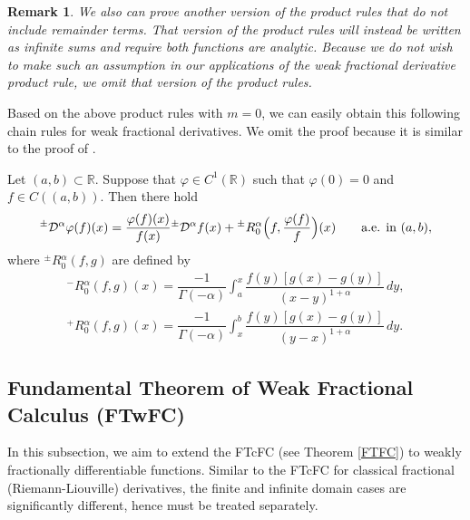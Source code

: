 \documentclass[leqno,final]{siamltex}
\numberwithin{equation}{section}
\newtheorem{remark}{Remark}[section]
\renewcommand{\(}{\bigl(}
\renewcommand{\)}{\bigr)}
\newcommand{\R}{\mathbb{R}}
\begin{document}
\begin{remark}
We also can prove another version of the product rules that do not include remainder terms. 
That version of the 
product rules will instead be written as infinite sums and require 
both functions are analytic. Because we do not wish to make such 
an assumption in our applications of the  weak fractional derivative product rule, 
we omit that version of the product rules. 
\end{remark}
 
Based on the above product rules with $m=0$, we can easily obtain this following chain rules for weak fractional 
derivatives. We omit the proof because it is similar to the proof of \cite[Theorem 2.4]{Feng_Sutton}. 

\begin{theorem}\label{thm_CR_weak}
	Let $(a,b)\subset \R$. Suppose that $\varphi \in C^1(\R)$ such that $\varphi(0)=0$ and $f\in C((a,b))$. Then there hold
	\begin{align}\label{chain_rule_weak}
	{^{\pm}}{\mathcal{D}}{^{\alpha}}  \varphi(f)(x)  =   \frac{\varphi(f)(x)}{f(x)} {^{\pm}}{\mathcal{D}}{^{\alpha}} f(x)
	+ {^{\pm}}{R}{_{0}^{\alpha}}\Bigl(f, \frac{\varphi(f)}{f} \Bigr)(x) \qquad \mbox{a.e. in } (a,b),
	\end{align}
	where ${^{\pm}}{R}{_{0}^{\alpha}}(f, g)$  are defined by 
	\begin{align}\label{LeftProductRuleRemainder_0}
    	        {^{-}}{R}{^{\alpha}_{0}}(f,g)(x) = \dfrac{-1}{\Gamma(- \alpha)} \int_{a}^{x} \dfrac{f(y) [g(x)-g(y)]}{(x- y)^{1 + \alpha}} \, dy , \\
    	        \label{RightProductRuleRemainder_0}
    	        {^{+}}{R}{^{\alpha}_{0}} (f,g)(x) = \dfrac{-1}{\Gamma(-\alpha)} \int_{x}^{b} \dfrac{f(y) [g(x)-g(y)]}{(y-x)^{1+\alpha}}\,dy .
    	    \end{align}
	
\end{theorem}

\subsection{Fundamental Theorem of Weak Fractional Calculus (FTwFC)}\label{sec-4.6}

In this subsection, we aim to extend the FTcFC (see Theorem \ref{FTFC}) to weakly fractionally differentiable functions. Similar to the FTcFC for classical fractional (Riemann-Liouville) derivatives, the finite and infinite domain cases are significantly different, hence must be treated separately. 
\end{document}
